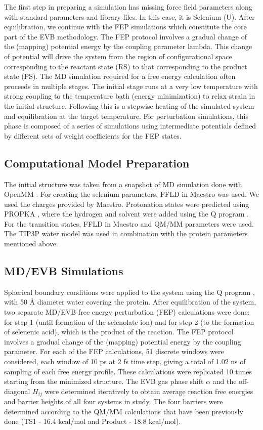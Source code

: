 \documentclass{article}
\begin{document}
The first step in preparing a simulation has missing force field parameters along with standard parameters and library files. In this case, it is Selenium (U). After equilibration, we continue with the FEP simulations which constitute the core part of the EVB methodology. The FEP protocol involves a gradual change of the (mapping) potential energy by the coupling parameter lambda. This change of potential will drive the system from the region of configurational space corresponding to the reactant state (RS) to that corresponding to the product state (PS). The MD simulation required for a free energy calculation often proceeds in multiple stages. The initial stage runs at a very low temperature with strong coupling to the temperature bath (energy minimization) to relax strain in the initial structure. Following this is a stepwise heating of the simulated system and equilibration at the target temperature. For perturbation simulations, this phase is composed of a series of simulations using intermediate potentials defined by different sets of weight coefficients for the FEP states.

\subsection{Computational Model Preparation}
The initial structure was taken from a snapshot of MD simulation done with OpenMM \cite{Eastman2017}. For creating the selenium parameters, FFLD in Maestro was used. We used the charges provided by Maestro. Protonation states were predicted using PROPKA \cite{Søndergaard2011}, where the hydrogen and solvent were added using the Q program \cite{Marelius1999}. For the transition states, FFLD in Maestro and QM/MM parameters were used. The TIP3P water model was used in combination with the protein parameters mentioned above.

\subsection{MD/EVB Simulations}

Spherical boundary conditions \cite{King1989} were applied to the system using the Q program \cite{Marelius1999}, with 50 Å diameter water covering the protein. After equilibration of the system, two separate MD/EVB free energy perturbation (FEP) calculations were done: for step 1 (until formation of the selenolate ion) and for step 2 (to the formation of selenenic acid), which is the product of the reaction. The FEP protocol involves a gradual change of the (mapping) potential energy by the coupling parameter. For each of the FEP calculations, 51 discrete windows were considered, each window of 10 ps at 2 fs time step, giving a total of 1.02 ns of sampling of each free energy profile. These calculations were replicated 10 times starting from the minimized structure. The EVB gas phase shift \(\alpha\) and the off-diagonal \(H_{ij}\) were determined iteratively to obtain average reaction free energies and barrier heights of all four systems in study. The four barriers were determined according to the QM/MM calculations that have been previously done (TS1 - 16.4 kcal/mol and Product - 18.8 kcal/mol).
\end{document}
